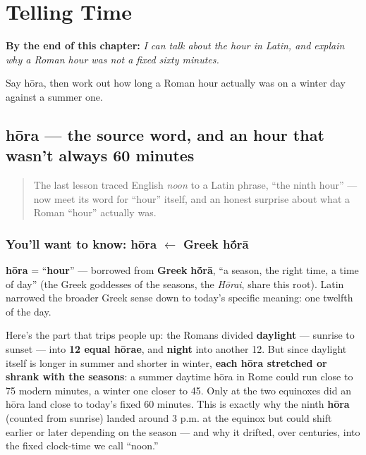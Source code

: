 
\chapter{Telling Time}
\label{ch:la-telling-time}

\begin{chapteropening}
\textbf{By the end of this chapter:} \emph{I can talk about the hour in Latin, and explain why a Roman hour was not a fixed sixty minutes.}

Say hōra, then work out how long a Roman hour actually was on a winter day against a summer one.
\end{chapteropening}

\section[hōra]{hōra — the source word, and an hour that wasn't always 60 minutes}

\label{lesson:LA-C13-hora}



\begin{quote}
The last lesson traced English \emph{noon} to a Latin phrase, \textquotedblleft{}the ninth hour\textquotedblright{} — now meet its word for \textquotedblleft{}hour\textquotedblright{} itself, and an honest surprise about what a Roman \textquotedblleft{}hour\textquotedblright{} actually was.
\end{quote}

\subsection*{You'll want to know: hōra $\leftarrow$ Greek h\'{\={o}}rā}
\textbf{hōra} = \textquotedblleft{}\textbf{hour}\textquotedblright{} — borrowed from \textbf{Greek} \textbf{h\'{\={o}}rā}, \textquotedblleft{}a season, the right time, a time of day\textquotedblright{} (the Greek goddesses of the seasons, the \emph{Hōrai}, share this root). Latin narrowed the broader Greek sense down to today's specific meaning: one twelfth of the day.

\begin{culture}
Here's the part that trips people up: the Romans divided \textbf{daylight} — sunrise to sunset — into \textbf{12 equal hōrae}, and \textbf{night} into another 12. But since daylight itself is longer in summer and shorter in winter, \textbf{each hōra stretched or shrank with the seasons}: a summer daytime hōra in Rome could run close to 75 modern minutes, a winter one closer to 45. Only at the two equinoxes did an hōra land close to today's fixed 60 minutes. This is exactly why the ninth \textbf{hōra} (counted from sunrise) landed around 3 p.m. at the equinox but could shift earlier or later depending on the season — and why it drifted, over centuries, into the fixed clock-time we call \textquotedblleft{}noon.\textquotedblright{}
\end{culture}

